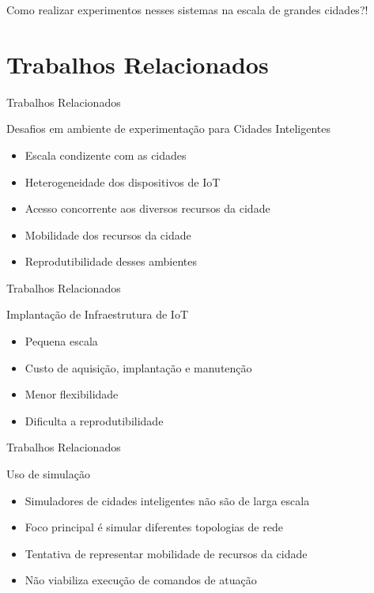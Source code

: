 \documentclass[xcolor={usenames,svgnames,dvipsnames},brazil,english,12pt,aspectratio=149]{beamer}
\begin{document}
\begin{frame}[standout]
	Como realizar experimentos nesses sistemas na escala de grandes cidades?!
\end{frame}

\section{Trabalhos Relacionados}

\begin{frame}{Trabalhos Relacionados}
    \begin{block}{Desafios em ambiente de experimentação para Cidades Inteligentes}
        \begin{itemize}
            \item Escala condizente com as cidades
            \item Heterogeneidade dos dispositivos de IoT
            \item Acesso concorrente aos diversos recursos da cidade
            \item Mobilidade dos recursos da cidade
            \item Reprodutibilidade desses ambientes
        \end{itemize}
    \end{block}
\end{frame}

\begin{frame}{Trabalhos Relacionados}
  \begin{block}{Implantação de Infraestrutura de IoT}
    \begin{itemize}
      \item Pequena escala
      \item Custo de aquisição, implantação e manutenção
      \item Menor flexibilidade
      \item Dificulta a reprodutibilidade
    \end{itemize}
  \end{block}
\end{frame}

\begin{frame}{Trabalhos Relacionados}
  \begin{block}{Uso de simulação}
    \begin{itemize}
      \item Simuladores de cidades inteligentes não são de larga escala
      \item Foco principal é simular diferentes topologias de rede
      \item Tentativa de representar mobilidade de recursos da cidade
      \item Não viabiliza execução de comandos de atuação
    \end{itemize}
  \end{block}
\end{frame}
\end{document}
